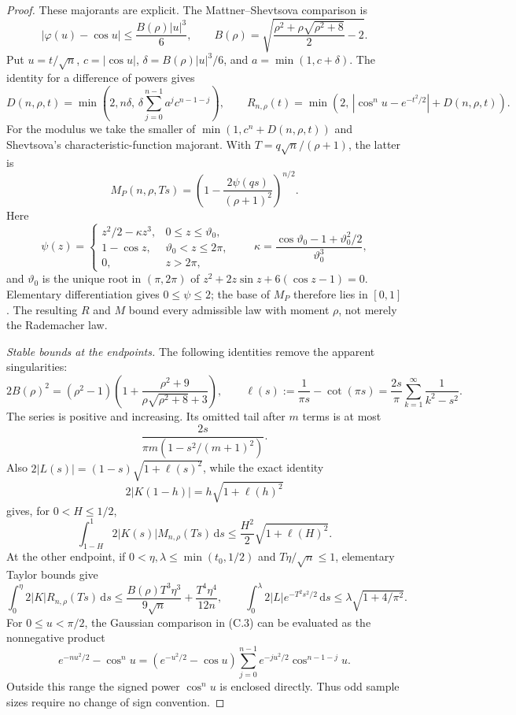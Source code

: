 \documentclass[11pt,a4paper]{article}
\numberwithin{equation}{section}
\theoremstyle{definition}
\theoremstyle{remark}
\newcommand{\dd}{\,\mathrm d}
\begin{document}
\begin{proof}
These majorants are explicit. The Mattner--Shevtsova comparison
\cite{MattnerShevtsova2019} is
\[
 |\varphi(u)-\cos u|\le\frac{B(\rho)|u|^3}{6},
 \qquad
 B(\rho)=
 \sqrt{\frac{\rho^2+\rho\sqrt{\rho^2+8}}2-2}.
\]
Put \(u=t/\sqrt n\), \(c=|\cos u|\),
\(\delta=B(\rho)|u|^3/6\), and \(a=\min(1,c+\delta)\). The identity for
a difference of powers gives
\[
 D(n,\rho,t)=\min\left(2,n\delta,\,
       \delta\sum_{j=0}^{n-1}a^jc^{n-1-j}\right),\qquad
 R_{n,\rho}(t)=\min\left(2,\,
             |\cos^n u-e^{-t^2/2}|+D(n,\rho,t)\right).
                                                               \tag{C.3}
\]
For the modulus we take the smaller of
\(\min(1,c^n+D(n,\rho,t))\) and Shevtsova's characteristic-function
majorant. With \(T=q\sqrt n/(\rho+1)\), the latter is
\[
 M_P(n,\rho,Ts)=
       \left(1-\frac{2\psi(qs)}{(\rho+1)^2}\right)^{n/2}.
\]
Here
\[
 \psi(z)=
 \begin{cases}
 z^2/2-\kappa z^3,&0\le z\le\vartheta_0,\\
 1-\cos z,&\vartheta_0<z\le2\pi,\\
 0,&z>2\pi,
 \end{cases}
 \qquad
 \kappa=\frac{\cos\vartheta_0-1+\vartheta_0^2/2}{\vartheta_0^3},
\]
and \(\vartheta_0\) is the unique root in \((\pi,2\pi)\) of
\(z^2+2z\sin z+6(\cos z-1)=0\).
Elementary differentiation gives \(0\le\psi\le2\);
the base of \(M_P\) therefore lies in \([0,1]\).
The resulting \(R\) and \(M\) bound every admissible law with moment \(\rho\),
not merely the Rademacher law.

\emph{Stable bounds at the endpoints.}
The following identities remove the apparent singularities:
\[
 2B(\rho)^2=(\rho^2-1)
   \left(1+\frac{\rho^2+9}{\rho\sqrt{\rho^2+8}+3}\right),
 \qquad
 \ell(s):=\frac1{\pi s}-\cot(\pi s)
       =\frac{2s}{\pi}\sum_{k=1}^{\infty}\frac1{k^2-s^2}.
                                                               \tag{C.4}
\]
The series is positive and increasing. Its omitted tail after \(m\) terms
is at most
\[
             \frac{2s}{\pi m(1-s^2/(m+1)^2)}.
\]
Also \(2|L(s)|=(1-s)\sqrt{1+\ell(s)^2}\), while the exact identity
\[
 2|K(1-h)|=h\sqrt{1+\ell(h)^2}
\]
gives, for \(0<H\le1/2\),
\[
 \int_{1-H}^1 2|K(s)|M_{n,\rho}(Ts)\dd s
          \le\frac{H^2}{2}\sqrt{1+\ell(H)^2}.             \tag{C.5}
\]
At the other endpoint, if \(0<\eta,\lambda\le\min(t_0,1/2)\) and
\(T\eta/\sqrt n\le1\), elementary Taylor bounds give
\[
 \int_0^\eta 2|K|R_{n,\rho}(Ts)\dd s
 \le\frac{B(\rho)T^3\eta^3}{9\sqrt n}
       +\frac{T^4\eta^4}{12n},\qquad
 \int_0^\lambda2|L|e^{-T^2s^2/2}\dd s
 \le\lambda\sqrt{1+4/\pi^2}.                             \tag{C.6}
\]
For \(0\le u<\pi/2\), the Gaussian comparison in (C.3) can be evaluated
as the nonnegative product
\[
 e^{-nu^2/2}-\cos^n u
 =(e^{-u^2/2}-\cos u)
   \sum_{j=0}^{n-1}e^{-ju^2/2}\cos^{n-1-j}u .
\]
Outside this range the signed power \(\cos^n u\) is enclosed directly.
Thus odd sample sizes require no change of sign convention.


\end{proof}
\end{document}
